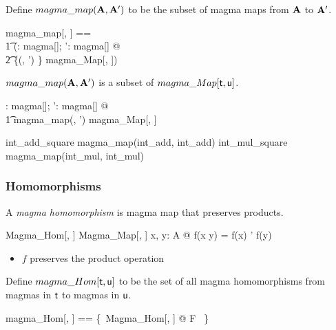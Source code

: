 \documentclass{amsart}
\begin{document}
Define $magma\_map(\mathbf{A}, \mathbf{A}')$ to be the subset of magma maps 
from $\mathbf{A}$ to $\mathbf{A}'$.

\begin{zed}
	magma\_map[\genT, \genU] == \\
	\t1	(\lambda \strucA: magma[\genT]; \strucA': magma[\genU] @ \\
	\t2		\{(\strucA, \strucA') \} \dres magma\_Map[\genT, \genU])
\end{zed}

\begin{remark} $magma\_map(\mathbf{A}, \mathbf{A}')$ is a subset of $magma\_Map[\mathsf{t}, \mathsf{u}]$.

\begin{zed}
	\forall \strucA: magma[\setT]; \strucA': magma[\setU] @ \\
	\t1	magma\_map(\strucA, \strucA') \subseteq magma\_Map[\setT, \setU]
\end{zed}

\end{remark}

\begin{example}

\begin{zed}
	int\_add\_square \in magma\_map(int\_add, int\_add)
\also
	int\_mul\_square \in magma\_map(int\_mul, int\_mul)
\end{zed}

\end{example}

\subsubsection{Homomorphisms}

A \textit{magma homomorphism} is magma map that preserves products.

\begin{schema}{Magma\_Hom}[\genT, \genU]
	Magma\_Map[\genT, \genU]
\where
	\forall x, y: A @ f(x \opG y) = f(x) \opG' f(y)
\end{schema}

\begin{itemize}
	\item $f$ preserves the product operation
\end{itemize}

Define $magma\_Hom[\mathsf{t}, \mathsf{u}]$ to be the set of all magma homomorphisms
from magmas in $\mathsf{t}$ to magmas in $\mathsf{u}$.

\begin{zed}
	magma\_Hom[\genT, \genU] == \{~Magma\_Hom[\genT, \genU] @ F ~\}
\end{zed}
\end{document}

